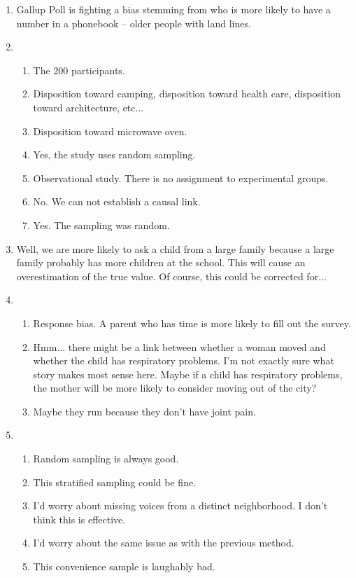 \documentclass[12pt,letterpaper]{article}
\begin{document}
\begin{enumerate}
\item Gallup Poll is fighting a bias stemming from who is more likely to have a number in a phonebook -- older people with land lines.

\item \begin{enumerate}
\item The 200 participants.
\item Disposition toward camping, disposition toward health care, disposition toward architecture, etc...
\item Disposition toward microwave oven.
\item Yes, the study uses random sampling.
\item Observational study. There is no assignment to experimental groups.
\item No. We can not establish a causal link.
\item Yes. The sampling was random.
\end{enumerate}

\item Well, we are more likely to ask a child from a large family because a large family probably has more children at the school. This will cause an overestimation of the true value. Of course, this could be corrected for...

\item \begin{enumerate}
\item Response bias. A parent who has time is more likely to fill out the survey.
\item Hmm... there might be a link between whether a woman moved and whether the child has respiratory problems. I'm not exactly sure what story makes most sense here. Maybe if a child has respiratory problems, the mother will be more likely to consider moving out of the city?
\item Maybe they run because they don't have joint pain.
\end{enumerate}

\item \begin{enumerate}
\item Random sampling is always good.
\item This stratified sampling could be fine.
\item I'd worry about missing voices from a distinct neighborhood. I don't think this is effective.
\item I'd worry about the same issue as with the previous method.
\item This convenience sample is laughably bad.
\end{enumerate}


\end{enumerate}
\end{document}

